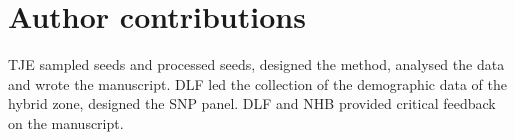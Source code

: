 \documentclass[10pt, a4paper, twocolumn]{article} %
\begin{document}
\section{Author contributions}

TJE sampled seeds and processed seeds, designed the method, analysed the data and wrote the manuscript.
DLF led the collection of the demographic data of the hybrid zone, designed the SNP panel.
DLF and NHB provided critical feedback on the manuscript. 

\printbibliography[title={Bibliography}] %

\end{document}
